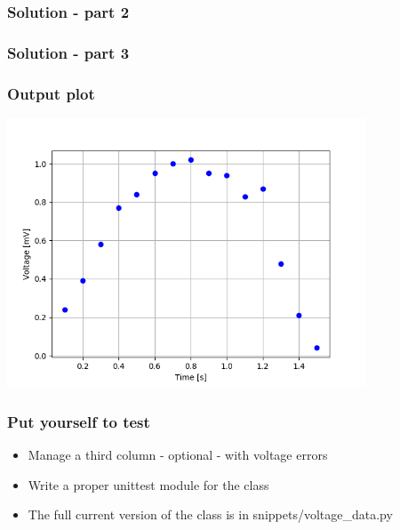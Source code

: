 \documentclass[9pt]{beamer}
\begin{document}
\begin{frame}
  \frametitle{Solution - part 2}
  
\end{frame}


\begin{frame}
  \frametitle{Solution - part 3}
  
\end{frame}


\begin{frame}
  \frametitle{Output plot}
  \centering
  \includegraphics[width=0.8\textwidth]{voltage_vs_time.png}
\end{frame}


\begin{frame}
  \frametitle{Put yourself to test}
  \begin{itemize}
    \item Manage a third column - optional - with voltage errors
    \item Write a proper unittest module for the class
    \item The full current version of the class is in snippets/voltage\_data.py
  \end{itemize}  
  
\end{frame}
\end{document}
